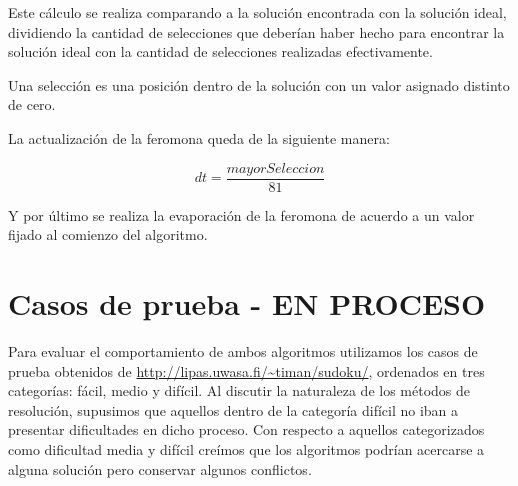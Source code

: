 \documentclass[a4paper,spanish]{article}
\begin{document}
Este cálculo se realiza comparando a la solución encontrada con la solución ideal, dividiendo la cantidad de selecciones que deberían 
haber hecho para encontrar la solución ideal con la cantidad de selecciones realizadas efectivamente.

Una selección es una posición dentro de la solución con un valor asignado distinto de cero.

La actualización de la feromona queda de la siguiente manera:

\begin{equation}
	dt = \dfrac{mayorSeleccion}{81}
\end{equation}

Y por último se realiza la evaporación de la feromona de acuerdo a un valor fijado al comienzo del algoritmo.



\clearpage

\section{Casos de prueba - EN PROCESO}

Para evaluar el comportamiento de ambos algoritmos utilizamos los casos de prueba obtenidos de \url{http://lipas.uwasa.fi/~timan/sudoku/}, ordenados en tres categorías: fácil, medio y difícil.
Al discutir la naturaleza de los métodos de resolución, supusimos que aquellos dentro de la categoría difícil no iban a presentar dificultades en dicho proceso. Con respecto a aquellos categorizados como dificultad media y difícil creímos que los algoritmos podrían acercarse a alguna solución pero conservar algunos conflictos.
\end{document}
